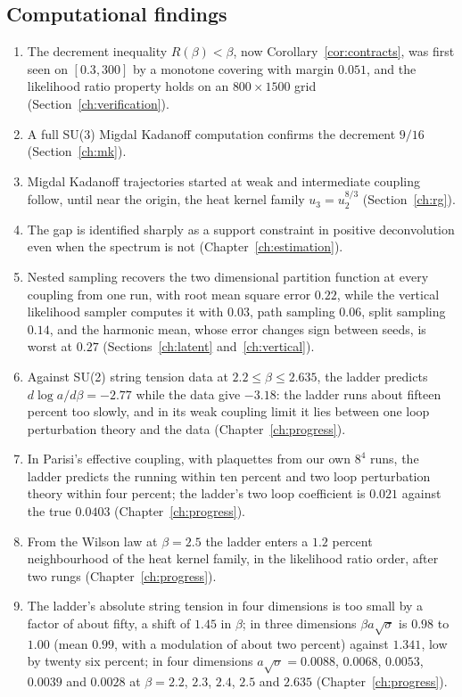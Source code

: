 \subsection{Computational findings}

\begin{enumerate}
\item The decrement inequality $R(\beta)<\beta$, now Corollary~\ref{cor:contracts}, was first seen on $[0.3,300]$ by a monotone covering with margin $0.051$, and the likelihood ratio property holds on an $800\times1500$ grid (Section~\ref{ch:verification}).
\item A full SU(3) Migdal Kadanoff computation confirms the decrement $9/16$ (Section~\ref{ch:mk}).
\item Migdal Kadanoff trajectories started at weak and intermediate coupling follow, until near the origin, the heat kernel family $u_3=u_2^{8/3}$ (Section~\ref{ch:rg}).
\item The gap is identified sharply as a support constraint in positive deconvolution even when the spectrum is not (Chapter~\ref{ch:estimation}).
\item Nested sampling recovers the two dimensional partition function at every coupling from one run, with root mean square error $0.22$, while the vertical likelihood sampler computes it with $0.03$, path sampling $0.06$, split sampling $0.14$, and the harmonic mean, whose error changes sign between seeds, is worst at $0.27$ (Sections~\ref{ch:latent} and~\ref{ch:vertical}).
\item Against SU(2) string tension data at $2.2\le\beta\le2.635$, the ladder predicts $d\log a/d\beta=-2.77$ while the data give $-3.18$: the ladder runs about fifteen percent too slowly, and in its weak coupling limit it lies between one loop perturbation theory and the data (Chapter~\ref{ch:progress}).
\item In Parisi's effective coupling, with plaquettes from our own $8^4$ runs, the ladder predicts the running within ten percent and two loop perturbation theory within four percent; the ladder's two loop coefficient is $0.021$ against the true $0.0403$ (Chapter~\ref{ch:progress}).
\item From the Wilson law at $\beta=2.5$ the ladder enters a $1.2$ percent neighbourhood of the heat kernel family, in the likelihood ratio order, after two rungs (Chapter~\ref{ch:progress}).
\item The ladder's absolute string tension in four dimensions is too small by a factor of about fifty, a shift of $1.45$ in $\beta$; in three dimensions $\beta a\sqrt\sigma$ is $0.98$ to $1.00$ (mean $0.99$, with a modulation of about two percent) against $1.341$, low by twenty six percent; in four dimensions $a\sqrt\sigma=0.0088$, $0.0068$, $0.0053$, $0.0039$ and $0.0028$ at $\beta=2.2$, $2.3$, $2.4$, $2.5$ and $2.635$ (Chapter~\ref{ch:progress}).

\end{enumerate}
